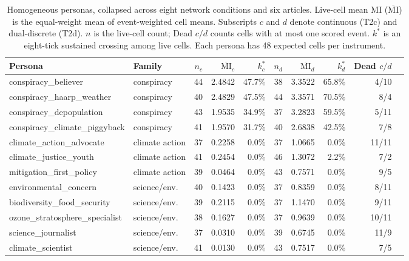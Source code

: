 \begin{table}[t]
\centering
\caption{Homogeneous personas, collapsed across eight network conditions and six
articles. Live-cell mean MI (\(\overline{\mathrm{MI}}\)) is the equal-weight mean of
event-weighted cell means. Subscripts \(c\) and \(d\) denote continuous (T2c) and
dual-discrete (T2d). \(n\) is the live-cell count; Dead \(c/d\) counts cells with at
most one scored event. \(k^{*}\) is an eight-tick sustained crossing among live
cells. Each persona has 48 expected cells per instrument.}
\label{tab:results-personas}
\scriptsize
\begin{tabular}{llrrrrrrrr}
\toprule
Persona & Family & \(n_c\) & \(\overline{\mathrm{MI}}_c\) & \(k^*_c\) &
\(n_d\) & \(\overline{\mathrm{MI}}_d\) & \(k^*_d\) & Dead \(c/d\) \\
\midrule
conspiracy\_believer & conspiracy & 44 & 2.4842 & 47.7\% & 38 & 3.3522 & 65.8\% & 4/10 \\
conspiracy\_haarp\_weather & conspiracy & 40 & 2.4829 & 47.5\% & 44 & 3.3571 & 70.5\% & 8/4 \\
conspiracy\_depopulation & conspiracy & 43 & 1.9535 & 34.9\% & 37 & 3.2823 & 59.5\% & 5/11 \\
conspiracy\_climate\_piggyback & conspiracy & 41 & 1.9570 & 31.7\% & 40 & 2.6838 & 42.5\% & 7/8 \\
climate\_action\_advocate & climate action & 37 & 0.2258 & 0.0\% & 37 & 1.0665 & 0.0\% & 11/11 \\
climate\_justice\_youth & climate action & 41 & 0.2454 & 0.0\% & 46 & 1.3072 & 2.2\% & 7/2 \\
mitigation\_first\_policy & climate action & 39 & 0.0464 & 0.0\% & 43 & 0.7571 & 0.0\% & 9/5 \\
environmental\_concern & science/env. & 40 & 0.1423 & 0.0\% & 37 & 0.8359 & 0.0\% & 8/11 \\
biodiversity\_food\_security & science/env. & 39 & 0.2115 & 0.0\% & 37 & 1.1470 & 0.0\% & 9/11 \\
ozone\_stratosphere\_specialist & science/env. & 38 & 0.1627 & 0.0\% & 37 & 0.9639 & 0.0\% & 10/11 \\
science\_journalist & science/env. & 37 & 0.0310 & 0.0\% & 39 & 0.6745 & 0.0\% & 11/9 \\
climate\_scientist & science/env. & 41 & 0.0130 & 0.0\% & 43 & 0.7517 & 0.0\% & 7/5 \\
\bottomrule
\end{tabular}
\end{table}

